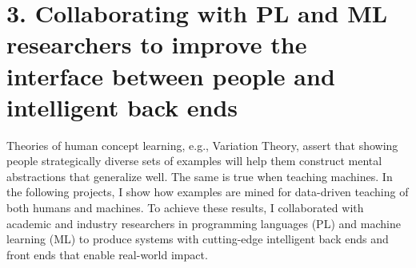 \documentclass[justified]{tufte-handout}
\begin{document}






\section{3. Collaborating with PL and ML researchers to improve the interface between people and intelligent back ends}\label{sec:teaching}
Theories of human concept learning, e.g., Variation Theory,\cite{vt} assert that showing people strategically diverse sets of examples will help them construct mental abstractions that generalize well. The same is true when teaching machines. In the following projects, I show how examples are mined for data-driven teaching of both humans and machines. To achieve these results, I collaborated with academic and industry researchers in programming languages (PL) and machine learning (ML) to produce systems with cutting-edge intelligent back ends and front ends that enable real-world impact. %
\end{document}
